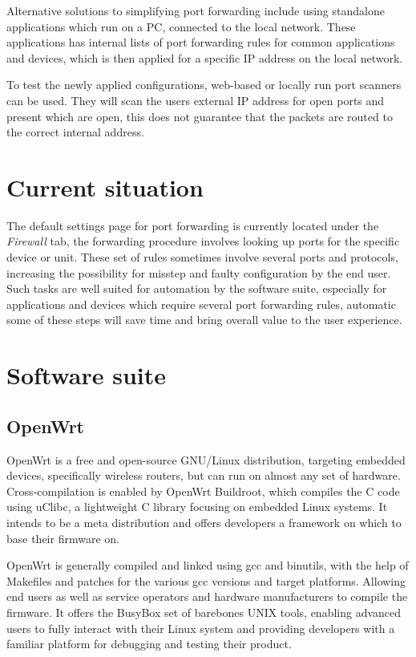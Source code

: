 \documentclass[a4paper,11pt]{kth-mag}
\begin{document}
Alternative solutions to simplifying port forwarding include using standalone applications which run on a PC, connected to the local network.
These applications has internal lists of port forwarding rules for common applications and devices, which is then applied for a specific IP address on the local network.
\cite{portforward.com}

To test the newly applied configurations, web-based or locally run port scanners can be used.
They will scan the users external IP address for open ports and present which are open, this does not guarantee that the packets are routed to the correct internal address.

\section{Current situation}
The default settings page for port forwarding is currently located under the \emph{Firewall} tab, the forwarding procedure involves looking up ports for the specific device or unit.
These set of rules sometimes involve several ports and protocols, increasing the possibility for misstep and faulty configuration by the end user.
Such tasks are well suited for automation by the software suite, especially for applications and devices which require several port forwarding rules, automatic some of these steps will save time and bring overall value to the user experience.

\section{Software suite}

\subsection{OpenWrt}
OpenWrt is a free and open-source GNU/Linux distribution, targeting embedded devices, specifically wireless routers, but can run on almost any set of hardware.
Cross-compilation is enabled by OpenWrt Buildroot, which compiles the C code using uClibc, a lightweight C library focusing on embedded Linux systems. 
It intends to be a meta distribution and offers developers a framework on which to base their firmware on.

OpenWrt is generally compiled and linked using gcc and binutils, with the help of Makefiles and patches for the various gcc versions and target platforms.
Allowing end users as well as service operators and hardware manufacturers to compile the firmware.
It offers the BusyBox set of barebones UNIX tools, enabling advanced users to fully interact with their Linux system and providing developers with a familiar platform for debugging and testing their product.
\cite{OpenWrt:structure_design}
\end{document}
